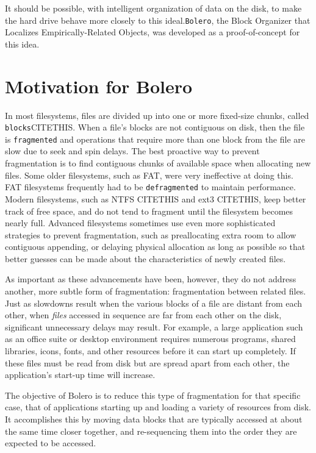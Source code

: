 \documentclass[10pt,twocolumn,letterpaper]{article}
\begin{document}
It should be possible, with intelligent organization of data on the disk, to make the hard drive behave
more closely to this ideal.\texttt{Bolero}, the Block Organizer that Localizes Empirically-Related Objects, was developed as a proof-of-concept for this idea.

\section{Motivation for Bolero}\label{sec:motive}

In most filesystems, files are divided up
into one or more fixed-size chunks, called \texttt{blocks}CITETHIS. When a file's blocks
are not contiguous on disk, then the file is \texttt{fragmented}
and operations that require more than one block from the file are slow due to
seek and spin delays. The best proactive way to prevent fragmentation is to find contiguous
chunks of available space when allocating new files. Some older filesystems, such as FAT, were
very ineffective at doing this\cite{fathistory}.
FAT filesystems frequently had to be \texttt{defragmented} to maintain performance.
Modern filesystems, such as NTFS CITETHIS and ext3 CITETHIS, keep better track of free space,
and do not tend to fragment until the filesystem becomes nearly full. Advanced filesystems sometimes
use even more sophisticated strategies to prevent fragmentation, such as preallocating extra room to allow 
contiguous appending, or delaying physical allocation as long as possible so that better guesses
can be made about the characteristics of newly created files\cite{xfs}.

As important as these advancements have been, however, they do not address another, more subtle form of fragmentation: fragmentation between related files.
Just as slowdowns result when the various blocks of a file are distant from each other, when \emph{files} accessed in sequence are far from each other on the disk, significant unnecessary delays may result. For example, a large application such as an office suite or desktop environment requires numerous programs, shared libraries, icons, fonts, and other resources before it can start up completely. If these files must be read from disk but are spread apart from each other, the application's start-up time will increase.

The objective of Bolero is to reduce this type of fragmentation for that specific case, that of applications
starting up and loading a variety of resources from disk. It accomplishes this by moving data blocks that are typically accessed at about the same time closer together, and re-sequencing them into the order they are expected to be accessed.
\end{document}
